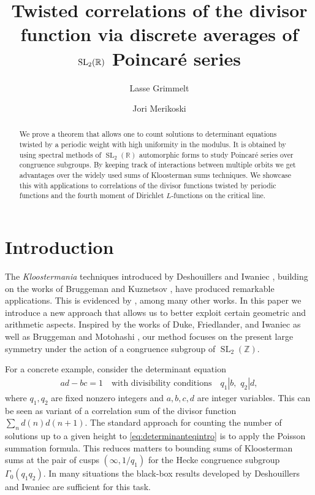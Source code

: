 \documentclass[12pt]{amsart}
\title{Twisted correlations of the divisor function via discrete averages of $\SL(\R)$ Poincar\'e series}
\author{Lasse Grimmelt}
\author{Jori Merikoski}
\date{}
\theoremstyle{definition}
\theoremstyle{remark}
\numberwithin{equation}{section}
\newcommand{\R}{{\mathbb R}}
\newcommand{\Z}{{\mathbb Z}}
\newcommand{\1}{{\mathbf 1}}
\newcommand{\SL}{\operatorname{SL}_2}
\begin{document}
\begin{abstract}
We prove a theorem that allows one to count solutions to determinant equations twisted by a periodic weight with high uniformity in the modulus. It is obtained by using spectral methods of $\SL(\R)$ automorphic forms to study Poincar\'e series over congruence subgroups. By keeping track of interactions between multiple orbits we get advantages over the widely used sums of Kloosterman sums techniques. We showcase this with applications to correlations of the divisor functions twisted by periodic functions and the fourth moment of Dirichlet $L$-functions on the critical line. 
\end{abstract}

\maketitle


\tableofcontents










\section{Introduction}
The \emph{Kloostermania} techniques introduced by Deshouillers and Iwaniec \cite{deshoullieriwaniec}, building on the works of Bruggeman \cite{brug} and Kuznetsov \cite{kuz}, have produced remarkable applications. This is evidenced by \cite{BFI,motohashi,petrowyoung,young}, among many other works. In this paper we introduce a new approach that allows us to better exploit certain geometric and arithmetic aspects. Inspired by the works of Duke, Friedlander, and Iwaniec \cite{DFIprimes} as well as Bruggeman and Motohashi \cite{BM}, our method focuses on the present large symmetry under the action of a congruence subgroup of $\SL(\Z)$.

For a concrete example, consider the determinant equation
\begin{align} \label{eq:determinanteqintro}
    ad - bc = 1 \quad \text{with divisibility conditions} \quad q_1 |b, \,\, q_2|d,
\end{align}
where $q_1,q_2$ are fixed nonzero integers and 
$a,b,c,d$ are integer variables. This can be seen as variant of a correlation sum of the divisor function $\sum_n d(n)d(n+1)$. The standard approach for counting the number of solutions up to a given height to \eqref{eq:determinanteqintro} is to apply the Poisson summation formula. This reduces matters to bounding sums of Kloosterman sums at the pair of cusps $(\infty,1/q_1)$ for the Hecke congruence subgroup $\Gamma_0(q_1 q_2)$. In many situations the black-box results developed by Deshouillers and Iwaniec \cite{deshoullieriwaniec} are sufficient for this task. 
\end{document}
